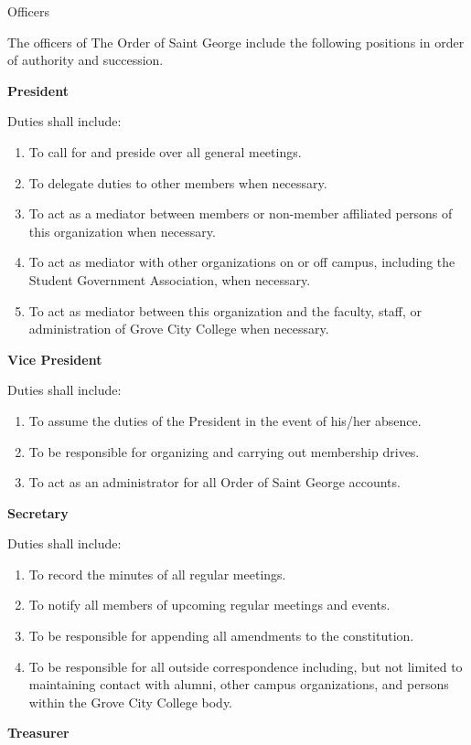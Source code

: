 {
\begin{article}{Officers}
	\item The officers of The Order of Saint George include the following positions in order of authority and succession.

	\item \textbf{President}

	Duties shall include:
	\begin{enumerate}
		\item To call for and preside over all general meetings.
		\item To delegate duties to other members when necessary.
		\item To act as a mediator between members or non-member affiliated persons of this organization when necessary.
		\item To act as mediator with other organizations on or off campus, including the Student Government Association, when necessary.
		\item To act as mediator between this organization and the faculty, staff, or administration of Grove City College when necessary.
	\end{enumerate}
	\item \textbf{Vice President}

	Duties shall include:
	\begin{enumerate}
		\item To assume the duties of the President in the event of his/her absence.
		\item To be responsible for organizing and carrying out membership drives.
		\item To act as an administrator for all Order of Saint George accounts.
	\end{enumerate}
	\item \textbf{Secretary}

	Duties shall include:
	\begin{enumerate}
		\item To record the minutes of all regular meetings.
		\item To notify all members of upcoming regular meetings and events.
		\item To be responsible for appending all amendments to the constitution.
		\item To be responsible for all outside correspondence including, but not limited to maintaining contact with alumni, other campus organizations, and persons within the Grove City College body.
	\end{enumerate}
	\item \textbf{Treasurer}


\end{article}}
